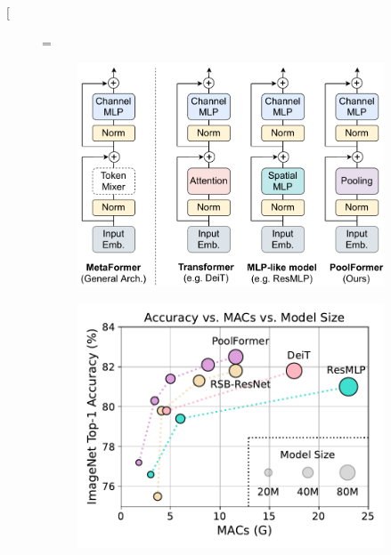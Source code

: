\documentclass[10pt,twocolumn,letterpaper]{article}
\begin{document}
\twocolumn[{
\maketitle
\vspace{-40pt}
\begin{figure}[H]
\hsize=\textwidth
\centering
\begin{subfigure}[b]{0.51\textwidth}
    \centering
    \includegraphics[width=1\textwidth]{figures/MetaFormer.pdf}
    \caption{}
\end{subfigure}    
\hspace{0.1in}
\begin{subfigure}[b]{0.42\textwidth}
     \centering
     \includegraphics[width=1\textwidth]{figures/MetaFormer_plot.pdf}

\end{subfigure}
\end{figure}}
\end{document}
